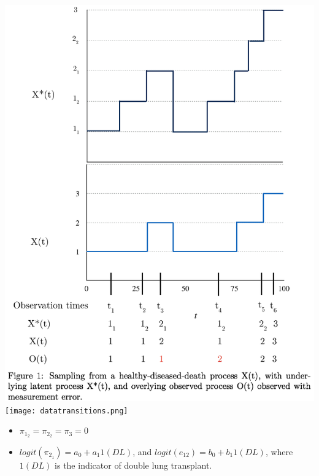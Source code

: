 \documentclass{beamer}
\begin{document}
\begin{frame}
\includegraphics[scale=0.4]{figprocessAndsampling5.png}
\hspace{3mm}
\texttt{[image: datatransitions.png]}
\end{frame}


\begin{frame}
\begin{itemize}
\item $\pi_{1_2}=\pi_{2_2}=\pi_3=0$
\vspace{5mm}
\item $logit(\pi_{2_1}) = a_0 + a_1 1(DL)$, and $logit(e_{12})=b_0 + b_1 1(DL)$, where $1(DL)$ is the indicator of double lung transplant.
\end{itemize}
\end{frame}
\end{document}
